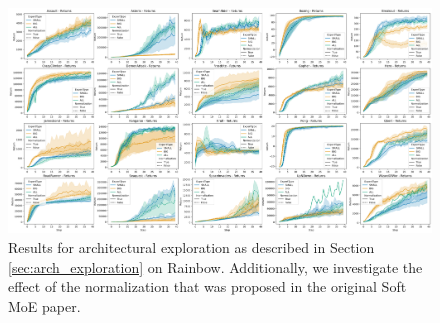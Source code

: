 \begin{figure}[!h]
    \centering
    \includegraphics[width=\textwidth]{figures/rainbow_all_games.png}
    \caption{Results for architectural exploration as described in Section \ref{sec:arch_exploration} on Rainbow. Additionally, we investigate the effect of the normalization that was proposed in the original Soft MoE paper.}
    \label{fig:rainbow_bigmoe_20_games}
\end{figure}


